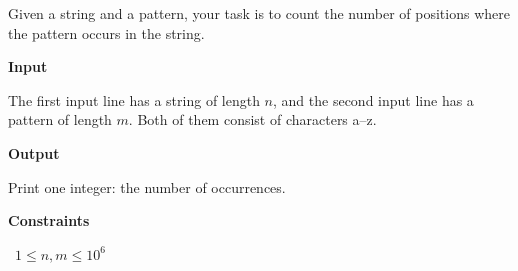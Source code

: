 Given a string and a pattern, your task is to count the number of positions where the pattern occurs in the string.

\vspace{0.3cm}\noindent\textbf{Input}

The first input line has a string of length $n$, and the second input line has a pattern of length $m$. Both of them consist of characters a–z.

\vspace{0.3cm}\noindent\textbf{Output}

Print one integer: the number of occurrences.

\vspace{0.3cm}\noindent\textbf{Constraints}

\textbullet\ $1 \le n,m \le 10^6$